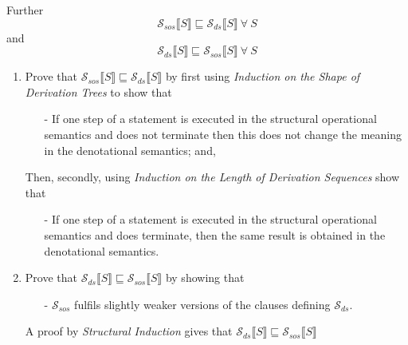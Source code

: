 \documentclass[11pt,a4paper]{article}
\begin{document}
Further
$$\mathcal{S}_{sos}\llbracket S\rrbracket\sqsubseteq\mathcal{S}_{ds}\llbracket S\rrbracket\ \forall\ S$$
and
$$\mathcal{S}_{ds}\llbracket S\rrbracket\sqsubseteq\mathcal{S}_{sos}\llbracket S\rrbracket\ \forall\ S$$

\begin{enumerate}
	\item Prove that $\mathcal{S}_{sos}\llbracket S\rrbracket\sqsubseteq\mathcal{S}_{ds}\llbracket S\rrbracket$ by first using \textit{Induction on the Shape of Derivation Trees} to show that
	\begin{itemize}
		\item[-] If one step of a statement is executed in the structural operational semantics and does not terminate then this does not change the meaning in the denotational semantics; and,
	\end{itemize}
	Then, secondly, using \textit{Induction on the Length of Derivation Sequences} show that
	\begin{itemize}
		\item[-] If one step of a statement is executed in the structural operational semantics and does terminate, then the same result is obtained in the denotational semantics.
	\end{itemize}
	\item Prove that $\mathcal{S}_{ds}\llbracket S\rrbracket\sqsubseteq\mathcal{S}_{sos}\llbracket S\rrbracket$ by showing that
	\begin{itemize}
		\item[-] $\mathcal{S}_{sos}$ fulfils slightly weaker versions of the clauses defining $\mathcal{S}_{ds}$.
	\end{itemize}
	A proof by \textit{Structural Induction} gives that $\mathcal{S}_{ds}\llbracket S\rrbracket\sqsubseteq\mathcal{S}_{sos}\llbracket S\rrbracket$
\end{enumerate}
\end{document}
